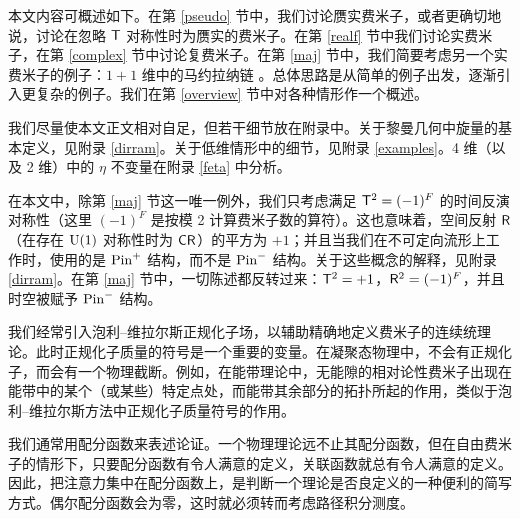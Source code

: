 本文内容可概述如下。在第 \ref{pseudo} 节中，我们讨论赝实费米子，或者更确切地说，讨论在忽略 ${\sf T}$ 对称性时为赝实的费米子。在第 \ref{realf} 节中我们讨论实费米子，在第 \ref{complex} 节中讨论复费米子。在第 \ref{maj} 节中，我们简要考虑另一个实费米子的例子：$1+1$ 维中的马约拉纳链 \cite{FK}。总体思路是从简单的例子出发，逐渐引入更复杂的例子。我们在第 \ref{overview} 节中对各种情形作一个概述。

我们尽量使本文正文相对自足，但若干细节放在附录中。关于黎曼几何中旋量的基本定义，见附录 \ref{dirram}。关于低维情形中的细节，见附录 \ref{examples}。4 维（以及 2 维）中的 $\eta$ 不变量在附录 \ref{feta} 中分析。

在本文中，除第 \ref{maj} 节这一唯一例外，我们只考虑满足 ${\sf T}^2=(-1)^F$ 的时间反演对称性（这里 $(-1)^F$ 是按模 2 计算费米子数的算符）。这也意味着，空间反射 ${\sf R}$（在存在 ${\mathrm U}(1)$ 对称性时为 ${\sf{CR}}$）的平方为 $+1$；并且当我们在不可定向流形上工作时，使用的是 ${\mathrm{Pin}}^+$ 结构，而不是 ${\mathrm{Pin}}^-$ 结构。关于这些概念的解释，见附录 \ref{dirram}。在第 \ref{maj} 节中，一切陈述都反转过来：${\sf T}^2=+1$，${\sf R}^2=(-1)^F$，并且时空被赋予 ${\mathrm{Pin}}^-$ 结构。

我们经常引入泡利--维拉尔斯正规化子场，以辅助精确地定义费米子的连续统理论。此时正规化子质量的符号是一个重要的变量。在凝聚态物理中，不会有正规化子，而会有一个物理截断。例如，在能带理论中，无能隙的相对论性费米子出现在能带中的某个（或某些）特定点处，而能带其余部分的拓扑所起的作用，类似于泡利--维拉尔斯方法中正规化子质量符号的作用。

我们通常用配分函数来表述论证。一个物理理论远不止其配分函数，但在自由费米子的情形下，只要配分函数有令人满意的定义，关联函数就总有令人满意的定义。因此，把注意力集中在配分函数上，是判断一个理论是否良定义的一种便利的简写方式。偶尔配分函数会为零，这时就必须转而考虑路径积分测度。

